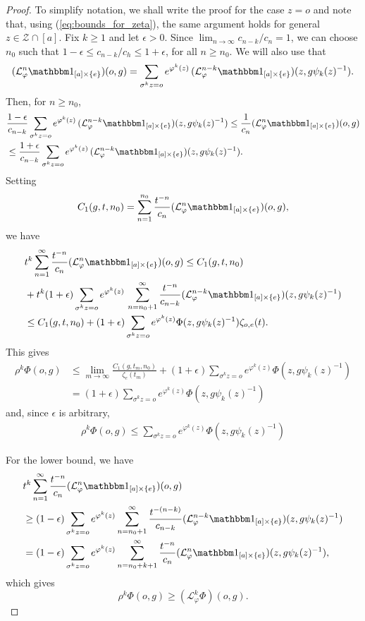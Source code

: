 \documentclass[11pt,letterpaper]{amsart}
\theoremstyle{definition}
\numberwithin{equation}{section}
\numberwithin{theorem}{section}
\def\vp{\varphi}
\begin{document}
\begin{proof}
To simplify notation, we shall write the proof for the case $z=o$ and note that, using
(\ref{eq:bounds_for_zeta}), the same argument holds for general $z \in \mathcal Z \cap [a]$.
Fix $k \ge 1$ and let $\epsilon>0$. Since
$\lim_{n \to \infty} c_{n-k}/c_n=1$, we can choose $n_0$ such that
$1-\epsilon \le c_{n-k}/c_h \le 1+\epsilon$, for all 
$n \ge n_0$.
We will also use that
\[
(\mathcal L_\vp^n \mathbbm 1_{[a] \times \{e\}})(o,g)
=
\sum_{\sigma^k z=o}
e^{\vp^k(z)} 
\,
(\mathcal L_\vp^{n-k} \mathbbm 1_{[a] \times \{e\}})(z,g\psi_k(z)^{-1}).
\]
Then, for $n \ge n_0$,
\begin{align*}
&\frac{1-\epsilon}{c_{n-k}}
\sum_{\sigma^k z=o}
e^{\vp^k(z)} 
\,
(\mathcal L_\vp^{n-k} \mathbbm 1_{[a] \times \{e\}})(z,g\psi_k(z)^{-1})
\le
\frac{1}{c_n} (\mathcal L_\vp^n \mathbbm 1_{[a] \times \{e\}})(o,g)
\\
&\le
\frac{1+\epsilon}{c_{n-k}}
\sum_{\sigma^k z=o}
e^{\vp^k(z)} 
\,
(\mathcal L_\vp^{n-k} \mathbbm 1_{[a] \times \{e\}})(z,g\psi_k(z)^{-1}).
\end{align*}
Setting
\[
C_1(g,t,n_0) = \sum_{n=1}^{n_0} 
\frac{t^{-n}}{c_n} (\mathcal L_\vp^n \mathbbm 1_{[a] \times \{e\}})(o,g),
\]
we have
\begin{align*}
&t^k \sum_{n=1}^\infty \frac{t^{-n}}{c_n} (\mathcal L_\vp^n \mathbbm 1_{[a] \times \{e\}})(o,g)
\le
C_1(g,t,n_0) 
\\
&+ t^k(1+\epsilon) \sum_{\sigma^kz=o}
e^{\vp^k(z)}
\,
\sum_{n=n_0+1}^\infty \frac{t^{-n}}{c_{n-k}}(\mathcal L_\vp^{n-k} \mathbbm 1_{[a] \times \{e\}})(z,g\psi_k(z)^{-1}) 
\\
&\le
C_1(g,t,n_0) + (1+\epsilon) \sum_{\sigma^kz=o} e^{\vp^k(z)}
\Phi(z,g\psi_k(z)^{-1}) \zeta_{o,e}(t).
\end{align*}
This gives
\begin{align*}
\rho^k \Phi(o,g) &\le \lim_{m\to \infty} \frac{C_1(g,t_m,n_0)}{\zeta_e(t_m)}
+(1+\epsilon) \sum_{\sigma^kz=o} e^{\vp^k(z)}
\Phi(z, g\psi_k(z)^{-1})
\\
&= (1+\epsilon) \sum_{\sigma^kz=o} e^{\vp^k(z)}
\Phi(z, g\psi_k(z)^{-1})
\end{align*}
and, since $\epsilon$ is arbitrary,
\begin{align*}
\rho^k \Phi(o,g) \le  \sum_{\sigma^kz=o} e^{\vp^k(z)}
\Phi(z, g\psi_k(z)^{-1})
\end{align*}


For the lower bound, we have 
\begin{align*}
&t^k \sum_{n=1}^\infty \frac{t^{-n}}{c_n}
(\mathcal L_\vp^n \mathbbm 1_{[a] \times \{e\}})(o,g)
\\
&\ge (1-\epsilon)\sum_{\sigma^k z=o} e^{\vp^k(z)}
\sum_{n=n_0+1}^\infty 
\frac{t^{-(n-k)}}{c_{n-k}}
(\mathcal L_\vp^{n-k} \mathbbm 1_{[a] \times \{e\}})(z,g\psi_k(z)^{-1})
\\
&=
(1-\epsilon) \sum_{\sigma^k z=o} e^{\vp^k(z)}
\sum_{n=n_0+k+1}^\infty 
\frac{t^{-n}}{c_{n}}
(\mathcal L_\vp^{n} \mathbbm 1_{[a] \times \{e\}})(z,g\psi_k(z)^{-1}),
\end{align*}
which gives
\[
\rho^k\Phi(o,g) \ge (\mathcal L_\vp^k \Phi)(o,g).
\]
\end{proof}
\end{document}
